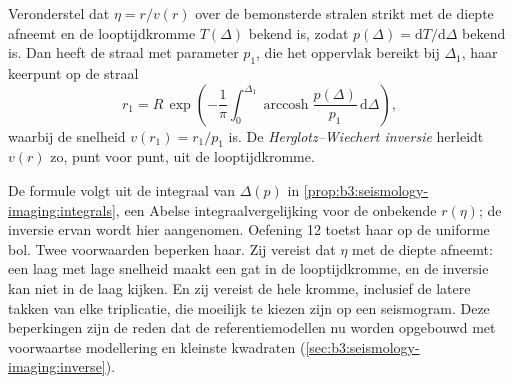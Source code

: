 \begin{omfigure}
\par{}
\label{fig:b3:seismology-imaging:tt}
\end{omfigure}

\begin{proposition}\label{prop:b3:seismology-imaging:herglotz}
Veronderstel dat $\eta = r/v(r)$ over de bemonsterde stralen strikt met de diepte afneemt
en de looptijdkromme $T(\Delta)$ bekend is, zodat $p(\Delta) =
\mathrm dT/\mathrm d\Delta$ bekend is. Dan heeft de straal met parameter $p_1$, die
het oppervlak bereikt bij $\Delta_1$, haar keerpunt op de straal
\[
  r_1 = R\,\exp\!\left(-\frac1\pi\int_0^{\Delta_1}
  \operatorname{arccosh}\frac{p(\Delta)}{p_1}\,\mathrm d\Delta\right),
\]
waarbij de snelheid $v(r_1) = r_1/p_1$ is. De \emph{Herglotz--Wiechert
inversie} herleidt $v(r)$ zo,
punt voor punt, uit de looptijdkromme.
\end{proposition}
\admitted

De formule volgt uit de integraal van $\Delta(p)$ in
\cref{prop:b3:seismology-imaging:integrals}, een Abelse integraalvergelijking
voor de onbekende $r(\eta)$; de inversie ervan wordt hier aangenomen.
Oefening 12 toetst haar op de uniforme bol. Twee voorwaarden beperken haar. Zij vereist
dat $\eta$ met de diepte afneemt: een laag met lage snelheid maakt een gat in de
looptijdkromme, en de inversie kan niet in de laag kijken. En zij vereist
de hele kromme, inclusief de latere takken van elke triplicatie, die
moeilijk te kiezen zijn op een seismogram. Deze beperkingen zijn de reden dat de referentiemodellen nu
worden opgebouwd met voorwaartse modellering en kleinste kwadraten (\cref{sec:b3:seismology-imaging:inverse}).

